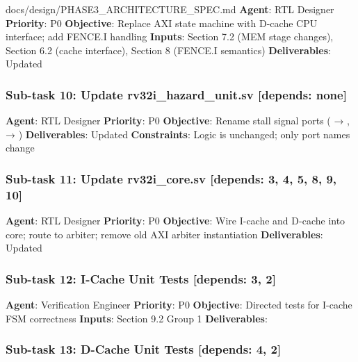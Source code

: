 \begin{relocated}{docs/design/PHASE3_ARCHITECTURE_SPEC.md}
\textbf{Agent}: RTL Designer \textbf{Priority}: P0 \textbf{Objective}:
Replace AXI state machine with D-cache CPU interface; add FENCE.I
handling \textbf{Inputs}: Section 7.2 (MEM stage changes), Section 6.2
(cache interface), Section 8 (FENCE.I semantics) \textbf{Deliverables}:
Updated 

\subsubsection{\texorpdfstring{Sub-task 10: Update
rv32i\_\allowbreak{}hazard\_\allowbreak{}unit.sv {[}depends:
none{]}}{Sub-task 10: Update rv32i\_hazard\_unit.sv {[}depends: none{]}}}\label{ds:ch:phase3-architecture:sub-task-10-update-rv32i-hazard-unitsv-depends-none}

\textbf{Agent}: RTL Designer \textbf{Priority}: P0 \textbf{Objective}:
Rename stall signal ports ( → ,
 → ) \textbf{Deliverables}:
Updated  \textbf{Constraints}:
Logic is unchanged; only port names change

\subsubsection{\texorpdfstring{Sub-task 11: Update
rv32i\_\allowbreak{}core.sv {[}depends: 3, 4, 5, 8, 9,
10{]}}{Sub-task 11: Update rv32i\_core.sv {[}depends: 3, 4, 5, 8, 9, 10{]}}}\label{ds:ch:phase3-architecture:sub-task-11-update-rv32i-coresv-depends-3-4-5-8-9-10}

\textbf{Agent}: RTL Designer \textbf{Priority}: P0 \textbf{Objective}:
Wire I-cache and D-cache into core; route to arbiter; remove old AXI
arbiter instantiation \textbf{Deliverables}: Updated

\subsubsection{Sub-task 12: I-Cache Unit Tests {[}depends: 3, 2{]}}\label{ds:ch:phase3-architecture:sub-task-12-i-cache-unit-tests-depends-3-2}

\textbf{Agent}: Verification Engineer \textbf{Priority}: P0
\textbf{Objective}: Directed tests for I-cache FSM correctness
\textbf{Inputs}: Section 9.2 Group 1 \textbf{Deliverables}:

\subsubsection{Sub-task 13: D-Cache Unit Tests {[}depends: 4, 2{]}}\label{ds:ch:phase3-architecture:sub-task-13-d-cache-unit-tests-depends-4-2}


\end{relocated}
